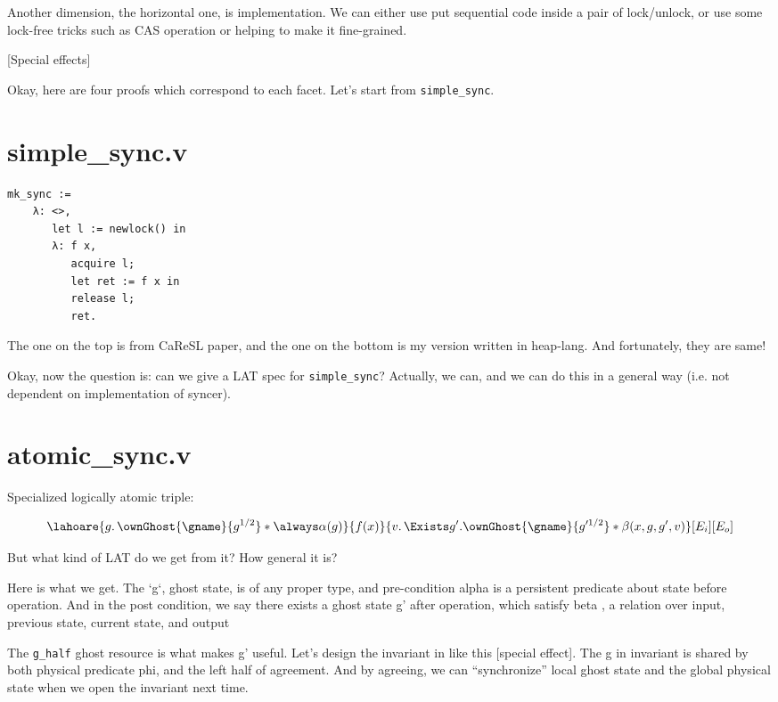 \documentclass[10pt]{article}
\begin{document}
Another dimension, the horizontal one, is implementation. We can either use put sequential code inside a pair of lock/unlock, or use some lock-free tricks such as CAS operation or helping to make it fine-grained.

[Special effects]

Okay, here are four proofs which correspond to each facet. Let’s start from \texttt{simple\_sync}.


\section{simple\_sync.v}

\begin{verbatim}
mk_sync :=
    λ: <>,
       let l := newlock() in
       λ: f x,
          acquire l;
          let ret := f x in
          release l;
          ret.
\end{verbatim}

The one on the top is from CaReSL paper, and the one on the bottom is my version written in heap-lang. And fortunately, they are same!

Okay, now the question is: can we give a LAT spec for \texttt{simple\_sync}? Actually, we can, and we can do this in a general way (i.e. not dependent on implementation of syncer).

\section{atomic\_sync.v}

Specialized logically atomic triple:

\[ \lahoare{g.\, \ownGhost{\gname}{g^{1/2}} * \always \alpha(g)}
           {f(x)}
           {v.\, \Exists g'. \ownGhost{\gname}{g'^{1/2}} * \beta(x, g, g', v)}[E_i][E_o]\]

But what kind of LAT do we get from it? How general it is?

Here is what we get. The `g`, ghost state, is of any proper type, and pre-condition alpha is a persistent predicate about state before operation. And in the post condition, we say there exists a ghost state g’ after operation, which satisfy beta , a relation over input, previous state, current state, and output

The \texttt{g\_half} ghost resource is what makes g’ useful. Let’s design the invariant in like this [special effect]. The g in invariant is shared by both physical predicate phi, and the left half of agreement. And by agreeing, we can “synchronize” local ghost state and the global physical state when we open the invariant next time.
\end{document}
